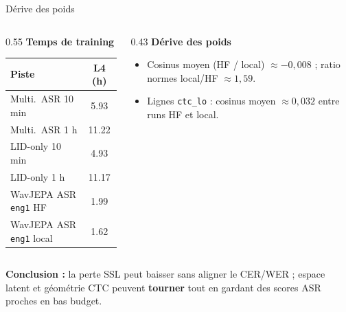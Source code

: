 \documentclass[aspectratio=169]{beamer}
\begin{document}
\begin{frame}{Dérive des poids}
\begin{columns}[T]
\begin{column}{0.55\textwidth}
\textbf{Temps de training} \\
\vspace{0.2em}
\begin{tabular}{@{}lc@{}}
\toprule
Piste & L4 (h) \\
\midrule
Multi.\ ASR 10 min & 5.93 \\
Multi.\ ASR 1 h & 11.22 \\
LID-only 10 min & 4.93 \\
LID-only 1 h & 11.17 \\
WavJEPA ASR \texttt{eng1} HF & 1.99 \\
WavJEPA ASR \texttt{eng1} local & 1.62 \\
\bottomrule
\end{tabular}
\end{column}
\begin{column}{0.43\textwidth}
\textbf{Dérive des poids} \\
\small
\begin{itemize}\setlength\itemsep{0.15em}
\item Cosinus moyen (HF / local) $\approx -0{,}008$ ; ratio normes local/HF $\approx 1{,}59$.
\item Lignes \texttt{ctc\_lo} : cosinus moyen $\approx 0{,}032$ entre runs HF et local.
\end{itemize}
\end{column}
\end{columns}

\vspace{0.35em}
\small \textbf{Conclusion :} la perte SSL peut baisser sans aligner le CER/WER ; espace latent et géométrie CTC peuvent \textbf{tourner} tout en gardant des scores ASR proches en bas budget.
\end{frame}
\end{document}
